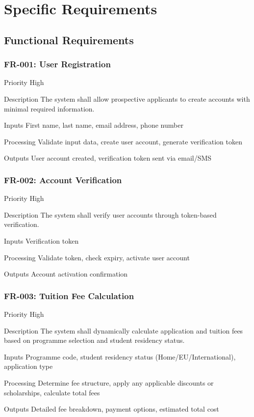 \documentclass[11pt]{article}
\newenvironment{frdescription}{%
  \begin{description}[font=\normalfont\sffamily\bfseries, labelwidth=2cm, leftmargin=2.2cm]%
}{%
  \end{description}%
}
\begin{document}
\section{Specific Requirements}

\subsection{Functional Requirements}

\subsubsection{FR-001: User Registration}
\begin{frdescription}
    \item[Priority] High
    \item[Description] The system shall allow prospective applicants to create accounts with minimal required information.
    \item[Inputs] First name, last name, email address, phone number
    \item[Processing] Validate input data, create user account, generate verification token
    \item[Outputs] User account created, verification token sent via email/SMS
\end{frdescription}

\subsubsection{FR-002: Account Verification}
\begin{frdescription}
    \item[Priority] High
    \item[Description] The system shall verify user accounts through token-based verification.
    \item[Inputs] Verification token
    \item[Processing] Validate token, check expiry, activate user account
    \item[Outputs] Account activation confirmation
\end{frdescription}

\subsubsection{FR-003: Tuition Fee Calculation}
\begin{frdescription}
    \item[Priority] High
    \item[Description] The system shall dynamically calculate application and tuition fees based on programme selection and student residency status.
    \item[Inputs] Programme code, student residency status (Home/EU/International), application type
    \item[Processing] Determine fee structure, apply any applicable discounts or scholarships, calculate total fees
    \item[Outputs] Detailed fee breakdown, payment options, estimated total cost
\end{frdescription}
\end{document}
